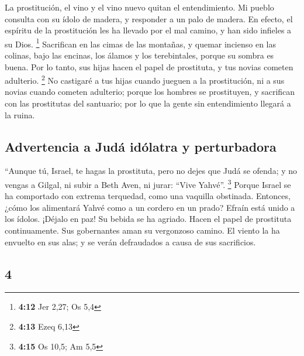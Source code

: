 \begin{paracol}{2}
 La prostitución, el vino y el vino nuevo quitan el
entendimiento.  Mi pueblo consulta con su ídolo de
madera, y responder a un palo de madera. En efecto, el espíritu de la
prostitución les ha llevado por el mal camino, y han sido infieles a su
Dios. \footnote{\textbf{4:12} Jer 2,27; Os 5,4} 
Sacrifican en las cimas de las montañas, y quemar incienso en las
colinas, bajo las encinas, los álamos y los terebintales, porque su
sombra es buena. Por lo tanto, sus hijas hacen el papel de prostituta, y
tus novias cometen adulterio. \footnote{\textbf{4:13} Ezeq 6,13}
 No castigaré a tus hijas cuando jueguen a la
prostitución, ni a sus novias cuando cometen adulterio; porque los
hombres se prostituyen, y sacrifican con las prostitutas del santuario;
por lo que la gente sin entendimiento llegará a la ruina.

\hypertarget{advertencia-a-juduxe1-iduxf3latra-y-perturbadora}{%
\subsection{Advertencia a Judá idólatra y
perturbadora}\label{advertencia-a-juduxe1-iduxf3latra-y-perturbadora}}

 ``Aunque tú, Israel, te hagas la prostituta, pero no
dejes que Judá se ofenda; y no vengas a Gilgal, ni subir a Beth Aven, ni
jurar: ``Vive Yahvé''. \footnote{\textbf{4:15} Os 10,5; Am 5,5}
 Porque Israel se ha comportado con extrema terquedad,
como una vaquilla obstinada. Entonces, ¿cómo los alimentará Yahvé como a
un cordero en un prado?  Efraín está unido a los ídolos.
¡Déjalo en paz!  Su bebida se ha agriado. Hacen el papel
de prostituta continuamente. Sus gobernantes aman su vergonzoso camino.
 El viento la ha envuelto en sus alas; y se verán
defraudados a causa de sus sacrificios.

\switchcolumn
\begin{otherlanguage}{english}

\hypertarget{section-7}{%
\section{4}\label{section-7}}


\end{otherlanguage}
\end{paracol}
